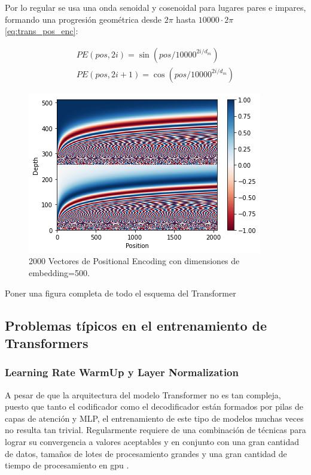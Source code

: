 Por lo regular se usa una onda senoidal y cosenoidal para lugares pares e impares, formando una progresión
geométrica desde $2\pi$ hasta $10000 \cdot 2\pi$ \ref{eq:trans_pos_enc}:

\begin{equation}
    \begin{split}
        PE(pos, 2i) = \sin(pos/10000^{2i/d_m})\\
        PE(pos, 2i+1) = \cos(pos/10000^{2i/d_m})
    \end{split}
    \label{eq:trans_pos_enc}
\end{equation}


\begin{figure}[ht!]
    \centering
    \includegraphics[width=0.5 \textwidth]{Chapters/2. Transformer/Figures/transformer/pos_enc.png}
    \caption{2000 Vectores de Positional Encoding con dimensiones de embedding=500.}
    \label{fig:trans_pos_enc}
\end{figure}

Poner una figura completa de todo el esquema del Transformer

\subsection{Problemas típicos en el entrenamiento de Transformers}

\subsubsection{Learning Rate WarmUp y Layer Normalization}

A pesar de que la arquitectura del modelo Transformer no es tan compleja, puesto que tanto el
codificador como el decodificador están formados por pilas de capas de atención y MLP, el
entrenamiento de este tipo de modelos muchas veces no resulta tan trivial. Regularmente requiere de
una combinación de técnicas para lograr su convergencia a valores aceptables y en conjunto con una
gran cantidad de datos, tamaños de lotes de procesamiento grandes y una gran cantidad de tiempo
de procesamiento en gpu \cite{DBLP:journals/corr/abs-1804-00247}.

